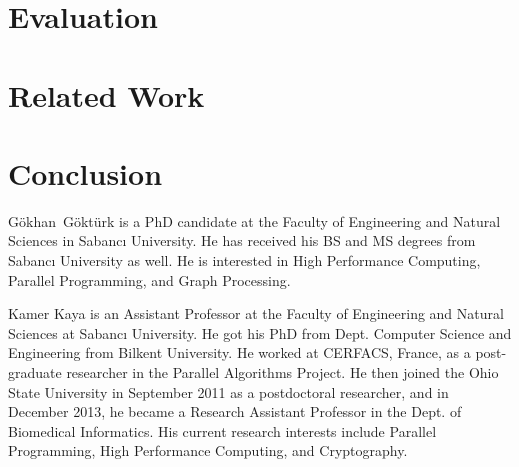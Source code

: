 \documentclass[10pt,journal,compsoc]{IEEEtran}
\begin{document}
\begin{algorithm}
\begin{algorithmic}[1]
        \EndFor
    \end{algorithmic}
    \end{algorithm}

\section{Evaluation}\label{sec:evaluation}

\section{Related Work}\label{sec:relatedwork}

\section{Conclusion}\label{sec:conclusion}

\ifCLASSOPTIONcaptionsoff
  \newpage
\fi




\begin{IEEEbiography}{G\"{o}khan~G\"{o}kt\"{u}rk} is a PhD candidate at the Faculty of Engineering and Natural Sciences in Sabancı University. He has received his BS and MS degrees from Sabancı University as well. He is interested in High Performance Computing, Parallel Programming, and Graph Processing.
\end{IEEEbiography}
\begin{IEEEbiography}{Kamer Kaya} is an Assistant Professor at the Faculty of Engineering and Natural Sciences at Sabancı University. He got his PhD from Dept. Computer Science and Engineering from Bilkent University. He worked at CERFACS, France, as a post-graduate researcher in the Parallel Algorithms Project. He then joined the Ohio State University in September 2011 as a postdoctoral researcher, and in December 2013, he became a Research Assistant Professor in the Dept. of Biomedical Informatics.
His current research interests include Parallel Programming, High Performance Computing, and Cryptography. 
    \end{IEEEbiography}
\end{document}
